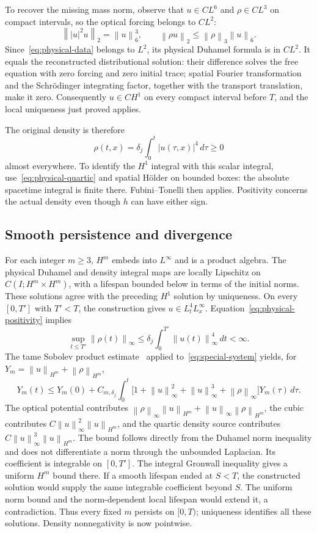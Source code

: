 \documentclass[11pt]{article}
\numberwithin{equation}{section}
\theoremstyle{remark}
\newcommand{\norm}[1]{\left\|#1\right\|}
\begin{document}
To recover the missing mass norm, observe that $u\in CL^6$ and
$\rho\in CL^3$ on compact intervals, so the optical forcing belongs to
$CL^2$:
\[
 \norm{|u|^2u}_2=\norm u_6^3,
 \qquad \norm{\rho u}_2\le\norm\rho_3\norm u_6.
\]
Since~\eqref{eq:physical-data} belongs to $L^2$, its physical Duhamel
formula is in $CL^2$. It equals the reconstructed distributional solution:
their difference solves the free equation with zero forcing and zero
initial trace; spatial Fourier transformation and the Schr\"odinger
integrating factor, together with the transport translation, make it zero.
Consequently $u\in CH^1$ on every compact interval before $T$, and the
local uniqueness just proved applies.

The original density is therefore
\begin{equation}\label{eq:physical-positivity}
 \rho(t,x)=\delta_j\int_0^t |u(\tau,x)|^4\,d\tau\ge0
\end{equation}
almost everywhere. To identify the $H^1$ integral with this scalar
integral, use~\eqref{eq:physical-quartic} and spatial H\"older on bounded
boxes: the absolute spacetime integral is finite there. Fubini--Tonelli
then applies. Positivity concerns the actual density even though $h$ can
have either sign.

\subsection{Smooth persistence and divergence}

For each integer $m\ge3$, $H^m$ embeds into $L^\infty$ and is a product
algebra. The physical Duhamel and density integral maps are locally
Lipschitz on $C(I;H^m\times H^m)$, with a lifespan bounded below in
terms of the initial norms. These solutions agree with the preceding
$H^1$ solution by uniqueness.
On every $[0,T']$ with $T'<T$, the construction gives
$u\in L^4_tL^\infty_x$. Equation~\eqref{eq:physical-positivity} implies
\[
 \sup_{t\le T'}\norm{\rho(t)}_\infty
       \le\delta_j\int_0^{T'}\norm{u(t)}_\infty^4\,dt<\infty.
\]
The tame Sobolev product estimate~\cite[Appendix A, Lemma A.8]{Tao}
applied to~\eqref{eq:special-system} yields, for
$Y_m=\norm u_{H^m}+\norm\rho_{H^m}$,
\begin{equation}\label{eq:persistence}
 Y_m(t)\le Y_m(0)+C_{m,\delta_j}\int_0^t
 \bigl[1+\norm u_\infty^2+\norm u_\infty^3+\norm\rho_\infty\bigr]
                    Y_m(\tau)\,d\tau.
\end{equation}
The optical potential contributes
$\norm\rho_\infty\norm u_{H^m}+
\norm u_\infty\norm\rho_{H^m}$, the cubic contributes
$C\norm u_\infty^2\norm u_{H^m}$, and the quartic density source
contributes $C\norm u_\infty^3\norm u_{H^m}$.
The bound follows directly from the Duhamel norm inequality and does
not differentiate a norm through the unbounded Laplacian.
Its coefficient is integrable on $[0,T']$. The integral Gronwall
inequality gives a uniform $H^m$ bound there.
If a smooth lifespan ended at $S<T$, the constructed solution would
supply the same integrable coefficient beyond $S$. The uniform norm
bound and the norm-dependent local lifespan would extend it, a
contradiction. Thus every fixed $m$ persists on $[0,T)$; uniqueness
identifies all these solutions. Density nonnegativity is now pointwise.
\end{document}
